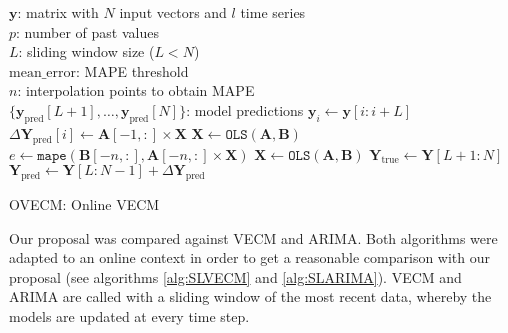 \begin{algorithm}[ht]
\begin{algorithmic}[1]
\REQUIRE $\,$ \\
$\mathbf{y}$: matrix with $N$ input vectors and $l$ time series\\
$p$: number of past values \\
$L$: sliding window size ($L<N$) \\
$\text{mean\_error}$: MAPE threshold \\
$n$: interpolation points to obtain MAPE \\
\ENSURE  $\,$ \\
$\{\mathbf{y}_{\text{pred}}[L+1],\dots,\mathbf{y}_{\text{pred}}[N]\}$: model predictions 
    \STATE $\mathbf{y}_i \gets \mathbf{y}[i:i+L]$
	\ELSE
        \STATE $\Delta \mathbf{Y}_{\text{pred}}[i] \gets \mathbf{A}[-1,:] \times \mathbf{X}$
    \ENDIF
    \STATE $\mathbf{X} \gets \texttt{OLS} (\mathbf{A},\mathbf{B})$
    \STATE $e \gets \texttt{mape}(\mathbf{B}[-n,:],\mathbf{A}[-n,:] \times \mathbf{X})$
        \STATE $\mathbf{X} \gets \texttt{OLS} (\mathbf{A},\mathbf{B})$
    \ENDIF
\ENDFOR
\STATE $\mathbf{Y}_{\text{true}} \gets \mathbf{Y}[L+1:N]$
\STATE $\mathbf{Y}_{\text{pred}}\gets 
\mathbf{Y}[L:N-1] +\Delta \mathbf{Y}_{\text{pred}}$
\end{algorithmic}
\caption{OVECM: Online VECM}
\label{alg:proposal}
\end{algorithm}



Our proposal was compared against VECM and ARIMA. Both algorithms were adapted
to an online context in order to get a reasonable comparison with our proposal
(see algorithms \ref{alg:SLVECM} and \ref{alg:SLARIMA}). VECM and ARIMA are
called with a sliding window of the most recent data, whereby the models are
updated at every time step.

